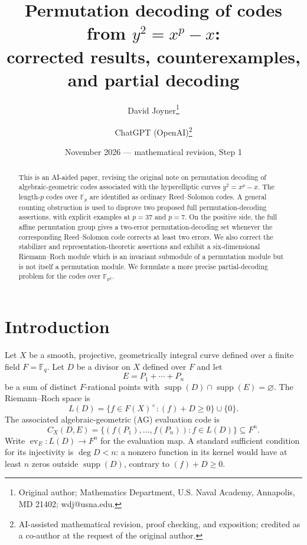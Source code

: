 \documentclass[12pt]{article}
\numberwithin{equation}{section}
\newcommand{\F}{\mathbb{F}}
\newcommand{\supp}{\operatorname{supp}}
\newcommand{\ev}{\operatorname{ev}}
\begin{document}
\title{Permutation decoding of codes from $y^2=x^p-x$:\\
corrected results, counterexamples, and partial decoding}
\author{David Joyner\thanks{Original author; Mathematics Department,
U.S. Naval Academy, Annapolis, MD 21402; wdj@usna.edu.}
\and ChatGPT (OpenAI)\thanks{AI-assisted mathematical revision,
proof checking, and exposition; credited as a co-author at the
request of the original author.}}
\date{November 2026 --- mathematical revision, Step 1}
\maketitle
\begin{abstract}
This is an AI-aided paper, revising the original note on permutation decoding
of algebraic-geometric codes associated with the hyperelliptic curves
$y^2=x^p-x$.  The length-$p$ codes over $\F_p$ are identified as ordinary
Reed--Solomon codes.  A general counting obstruction is used to disprove
two proposed full permutation-decoding assertions, with explicit examples
at $p=37$ and $p=7$.  On the positive side, the full affine permutation group
gives a two-error permutation-decoding set whenever the corresponding
Reed--Solomon code corrects at least two errors.  We also correct the
stabilizer and representation-theoretic assertions and exhibit a
six-dimensional Riemann--Roch module which is an invariant submodule of a
permutation module but is not itself a permutation module.  We formulate
a more precise partial-decoding problem for the codes over $\F_{p^2}$.
\end{abstract}

\section{Introduction}
Let $X$ be a smooth, projective, geometrically integral curve defined over a
finite field $F=\F_q$.  Let $D$ be a divisor on $X$ defined over $F$ and let
\[
E=P_1+\cdots+P_n
\]
be a sum of distinct $F$-rational points with
$\supp(D)\cap\supp(E)=\varnothing$.  The Riemann--Roch space is
\[
L(D)=\{f\in F(X)^\times:(f)+D\geq0\}\cup\{0\}.
\]
The associated algebraic-geometric (AG) evaluation code is
\begin{equation}\label{eq:AGcode}
C_X(D,E)=\{(f(P_1),\ldots,f(P_n)):f\in L(D)\}\subseteq F^n.
\end{equation}
Write $\ev_E:L(D)\to F^n$ for the evaluation map.  A standard
sufficient condition for its injectivity is $\deg D<n$: a nonzero
function in its kernel would have at least $n$ zeros outside
$\supp(D)$, contrary to $(f)+D\geq0$.
\end{document}
